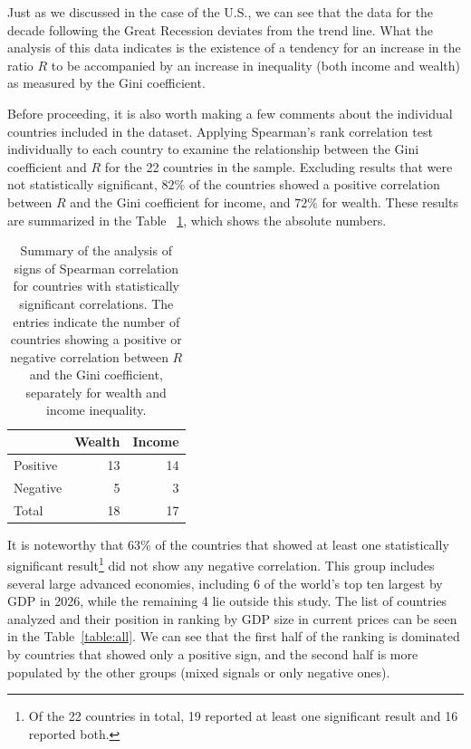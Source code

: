 \documentclass[12pt]{article}
\begin{document}
Just as we discussed in the case of the U.S., we can see that the data for the decade following the Great Recession deviates from the trend line. What the analysis of this data indicates is the existence of a tendency for an increase in the ratio $R$ to be accompanied by an increase in inequality (both income and wealth) as measured by the Gini coefficient. 

Before proceeding, it is also worth making a few comments about the individual countries included in the dataset. Applying Spearman's rank correlation test individually to each country to examine the relationship between the  Gini coefficient and $R$ for the 22 countries in the sample. Excluding results that were not statistically significant, $82\%$ of the countries showed a positive correlation between $R$ and the Gini coefficient for income, and $72\%$ for wealth. These results are summarized in the Table ~\ref{table1}, which shows the absolute numbers.

\begin{table}[h!]
\centering
\begin{tabular}{lrr}
         & Wealth & Income \\
         \hline
Positive & 13& 14\\
Negative & 5      & 3      \\
Total    & 18& 17\end{tabular}
\caption{Summary of the analysis of signs of Spearman correlation for countries with statistically significant correlations. The entries indicate the number of countries showing a positive or negative correlation between $R$ and the Gini coefficient, separately for wealth and income inequality.
}
\label{table1}
\end{table}

It is noteworthy that 63\% of the countries that showed at least one statistically significant result\footnote{Of the 22 countries in total, 19 reported at least one significant result and 16 reported both.} did not show any negative correlation. This group includes several large advanced economies, including 6 of the world’s top ten largest by GDP in 2026, while the remaining 4 lie outside this study\cite{imfgpd}. The list of countries analyzed and their position in ranking by GDP size in current prices can be seen in the Table~\ref{table:all}. We can see that the first half of the ranking is dominated by countries that showed only a positive sign, and the second half is more populated by the other groups (mixed signals or only negative ones). 
\end{document}
